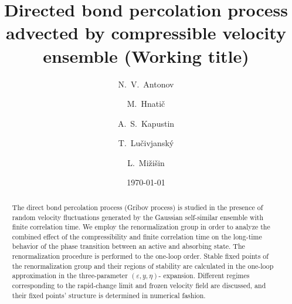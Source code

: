 \documentclass[aps,pre,url,twocolumn,superscriptaddress]{revtex4-1}
\def\eps{\varepsilon}
\begin{document}

\title {Directed bond percolation process advected by compressible velocity ensemble (Working title)}
\author{N.~V.~Antonov} 
\author{M.~Hnati\v{c}}
\author{A.~S.~Kapustin}
\author{T.~Lu\v{c}ivjansk\'y}
\author{L.~Mi\v{z}i\v{s}in}
\date{\today}
\begin{abstract}
The direct bond percolation process (Gribov process) is studied in the presence of
 random velocity fluctuations generated by the Gaussian self-similar ensemble
 with finite correlation time. We employ the renormalization group in order 
to analyze the combined effect of the compressibility and finite
correlation time on the long-time behavior of the phase transition between an active and absorbing
state. The renormalization procedure is performed to the one-loop order. 
Stable fixed points of the renormalization group and their regions of stability are
calculated in the one-loop approximation in the three-parameter $(\eps,y,\eta)$-
expansion. Different regimes corresponding to the rapid-change limit and frozen velocity field
are discussed, and their fixed points' structure is determined in numerical fashion.
\end{abstract}
\pacs{}

\maketitle
\end{document}
